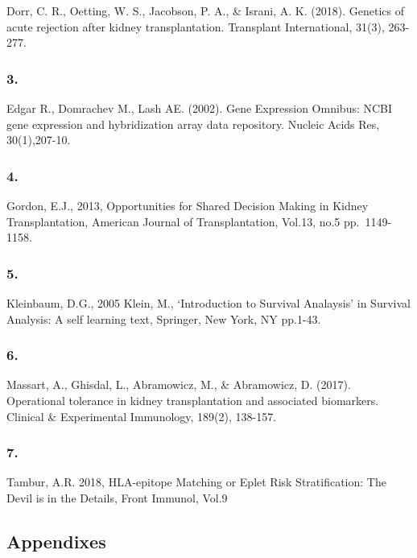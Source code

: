 \documentclass[a4paper,9pt,twocolumn,twoside,]{pinp}
\begin{document}
Dorr, C. R., Oetting, W. S., Jacobson, P. A., \& Israni, A. K. (2018).
Genetics of acute rejection after kidney transplantation. Transplant
International, 31(3), 263-277.

\hypertarget{section-2}{%
\subsubsection{3.}\label{section-2}}

Edgar R., Domrachev M., Lash AE. (2002). Gene Expression Omnibus: NCBI
gene expression and hybridization array data repository. Nucleic Acids
Res, 30(1),207-10.

\hypertarget{section-3}{%
\subsubsection{4.}\label{section-3}}

Gordon, E.J., 2013, Opportunities for Shared Decision Making in Kidney
Transplantation, American Journal of Transplantation, Vol.13, no.5
pp.~1149-1158.

\hypertarget{section-4}{%
\subsubsection{5.}\label{section-4}}

Kleinbaum, D.G., 2005 Klein, M., `Introduction to Survival Analaysis' in
Survival Analysis: A self learning text, Springer, New York, NY pp.1-43.

\hypertarget{section-5}{%
\subsubsection{6.}\label{section-5}}

Massart, A., Ghisdal, L., Abramowicz, M., \& Abramowicz, D. (2017).
Operational tolerance in kidney transplantation and associated
biomarkers. Clinical \& Experimental Immunology, 189(2), 138-157.

\hypertarget{section-6}{%
\subsubsection{7.}\label{section-6}}

Tambur, A.R. 2018, HLA-epitope Matching or Eplet Risk Stratification:
The Devil is in the Details, Front Immunol, Vol.9

\hypertarget{appendixes}{%
\subsection{Appendixes}\label{appendixes}}
\end{document}
